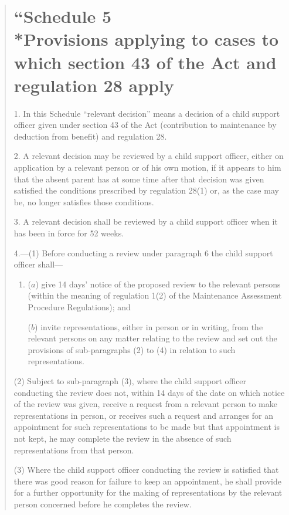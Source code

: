 \documentclass[12pt,a4paper]{article}
\begin{document}
\begin{quotation}
\part*{``Schedule 5\\*Provisions applying to cases to which section 43 of the Act and regulation 28 apply}

1.  In this Schedule “relevant decision” means a decision of a child support officer given under section 43 of the Act (contribution to maintenance by deduction from benefit) and regulation 28.

\medskip

2.  A relevant decision may be reviewed by a child support officer, either on application by a relevant person or of his own motion, if it appears to him that the absent parent has at some time after that decision was given satisfied the conditions prescribed by regulation 28(1) or, as the case may be, no longer satisfies those conditions.

\medskip

3.  A relevant decision shall be reviewed by a child support officer when it has been in force for 52 weeks.

\medskip

4.—(1) Before conducting a review under paragraph 6 the child support officer shall---
\begin{enumerate}\item[]
($a$) give 14 days' notice of the proposed review to the relevant persons (within the meaning of regulation 1(2) of the Maintenance Assessment Procedure Regulations); and

($b$) invite representations, either in person or in writing, from the relevant persons on any matter relating to the review and set out the provisions of sub-paragraphs (2) to (4) in relation to such representations.
\end{enumerate}

(2) Subject to sub-paragraph (3), where the child support officer conducting the review does not, within 14 days of the date on which notice of the review was given, receive a request from a relevant person to make representations in person, or receives such a request and arranges for an appointment for such representations to be made but that appointment is not kept, he may complete the review in the absence of such representations from that person.

(3) Where the child support officer conducting the review is satisfied that there was good reason for failure to keep an appointment, he shall provide for a further opportunity for the making of representations by the relevant person concerned before he completes the review.


\end{quotation}
\end{document}
